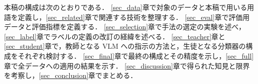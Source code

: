 本稿の構成は次のとおりである．
\ref{sec_data}章で対象のデータと本稿で用いる用語を定義し，\ref{sec_related}章で関連する技術を整理する．
\ref{sec_eval}章で評価用データと評価指標を定義する．
\ref{sec_selection}章で手法の選定の実験を述べ，\ref{sec_label}章でラベルの定義の改訂の経緯を述べる．
\ref{sec_teacher}章と\ref{sec_student}章で，教師となる VLM への指示の方法と，生徒となる分類器の構成をそれぞれ検討する．
\ref{sec_final}章で最終の構成とその精度を示し，\ref{sec_full}章で全データへの適用の結果を示す．
\ref{sec_discussion}章で得られた知見と限界を考察し，\ref{sec_conclusion}章でまとめる．
